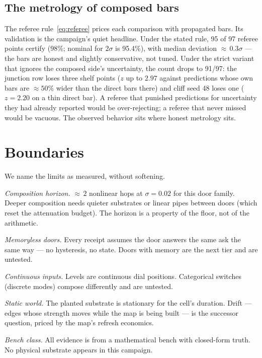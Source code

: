 \documentclass[11pt,a4paper]{article}
\begin{document}
\subsection{The metrology of composed bars}
\label{sec:metrology}

The referee rule~\eqref{eq:referee} prices each comparison with
propagated bars. Its validation is the campaign's quiet headline.
Under the stated rule, 95 of 97 referee points certify (98\%; nominal
for $2\sigma$ is 95.4\%), with median deviation ${\approx}\,0.3\sigma$
--- the bars are honest and slightly conservative, not tuned. Under
the strict variant that ignores the composed side's uncertainty, the
count drops to 91/97: the junction row loses three shelf points
($z$ up to $2.97$ against predictions whose own bars are
${\approx}50\%$ wider than the direct bars there) and cliff seed 48
loses one ($z{=}2.20$ on a thin direct bar). A referee that punished
predictions for uncertainty they had already reported would be
over-rejecting; a referee that never missed would be vacuous. The
observed behavior sits where honest metrology sits.

\section{Boundaries}
\label{sec:boundaries}

We name the limits as measured, without softening.

\emph{Composition horizon.} ${\approx}\,2$ nonlinear hops at
$\sigma{=}0.02$ for this door family. Deeper composition needs
quieter substrates or linear pipes between doors (which reset the
attenuation budget). The horizon is a property of the floor, not of
the arithmetic.

\emph{Memoryless doors.} Every receipt assumes the door answers the
same ask the same way --- no hysteresis, no state. Doors with memory
are the next tier and are untested.

\emph{Continuous inputs.} Levels are continuous dial positions.
Categorical switches (discrete modes) compose differently and are
untested.

\emph{Static world.} The planted substrate is stationary for the
cell's duration. Drift --- edges whose strength moves while the map is
being built --- is the successor question, priced by the map's
refresh economics.

\emph{Bench class.} All evidence is from a mathematical bench with
closed-form truth. No physical substrate appears in this campaign.
\end{document}
